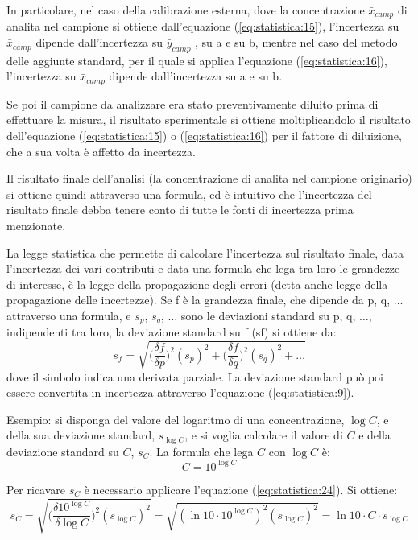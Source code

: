 In particolare, nel caso della calibrazione esterna, dove la concentrazione $\bar{x}_{camp}$ di analita nel campione si ottiene dall'equazione (\ref{eq:statistica:15}), l'incertezza su $\bar{x}_{camp}$ dipende dall'incertezza su $\bar{y}_{camp}$ , su a e su
b, mentre nel caso del metodo delle aggiunte standard, per il quale si applica l'equazione (\ref{eq:statistica:16}), l'incertezza su $\bar{x}_{camp}$ dipende dall'incertezza su a e su b.

Se poi il campione da analizzare era stato preventivamente diluito prima di effettuare la misura, il risultato sperimentale si ottiene moltiplicandolo il risultato dell'equazione (\ref{eq:statistica:15}) o (\ref{eq:statistica:16}) per il fattore di diluizione, che a sua volta è affetto da incertezza.

Il risultato finale dell'analisi (la concentrazione di analita nel campione originario) si ottiene quindi attraverso una formula, ed è intuitivo che l'incertezza del risultato finale debba tenere conto di tutte le fonti di incertezza prima menzionate.

La legge statistica che permette di calcolare l'incertezza sul risultato finale, data l'incertezza dei vari contributi e data una formula che lega tra loro le grandezze di interesse, è la legge della propagazione degli errori (detta anche legge della propagazione delle incertezze). Se f è la grandezza finale, che dipende da p, q, $\dots$ attraverso una formula, e $s_p$, $s_q$, $\dots$ sono le deviazioni standard su p, q, $\dots$, indipendenti tra loro, la deviazione standard su f (sf) si ottiene da:
\begin{equation} \label{eq:statistica:24}
s_f = \sqrt{\biggl(\frac{\delta f}{\delta p}\biggr)^2 (s_p)^2 + \biggl(\frac{\delta f}{\delta q}\biggr)^2 (s_q)^2 + \dots}
\end{equation}
dove il simbolo \delta indica una derivata parziale. La deviazione standard può poi essere convertita in incertezza attraverso l'equazione (\ref{eq:statistica:9}).

Esempio: si disponga del valore del logaritmo di una concentrazione, $\log C$, e della sua deviazione standard, $s_{\log C}$, e si voglia calcolare il valore di $C$ e della deviazione standard su $C$, $s_C$. La formula che lega $C$ con $\log C$ è:
\[
C = 10^{\log C}
\]

Per ricavare $s_C$ è necessario applicare l'equazione (\ref{eq:statistica:24}). Si ottiene:
\[
s_C = \sqrt{\biggl(\frac{\delta 10^{\log C}}{\delta \log C}\biggr)^2 (s_{\log C})^2} = \sqrt{(\ln 10 \cdot 10^{\log C})^2 (s_{\log C})^2} = \ln 10 \cdot C \cdot s_{\log C}
\]


